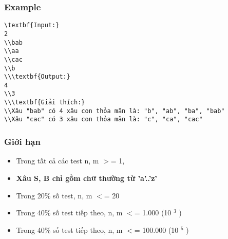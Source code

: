 \subsubsection{   Example  }
\begin{verbatim}
\textbf{Input:}
2
\\bab
\\aa
\\cac
\\b
\\\textbf{Output:}
4
\\3
\\\textbf{Giải thích:}
\\Xâu "bab" có 4 xâu con thỏa mãn là: "b", "ab", "ba", "bab"
\\Xâu "cac" có 3 xâu con thỏa mãn là: "c", "ca", "cac" \end{verbatim}

\subsubsection{   Giới hạn  }
\begin{itemize}
	\item     Trong tất cả các test n, m $>$= 1,   
	\item \textbf{     Xâu S, B chỉ gồm chữ thường từ 'a'..'z'    }
	\item     Trong 20\% số test, n, m $<$= 20   
	\item     Trong 40\% số test tiếp theo, n, m $<$= 1.000 (10    $^     3    $    )   
	\item     Trong 40\% số test tiếp theo, n, m $<$= 100.000 (10    $^     5    $    )   
\end{itemize}